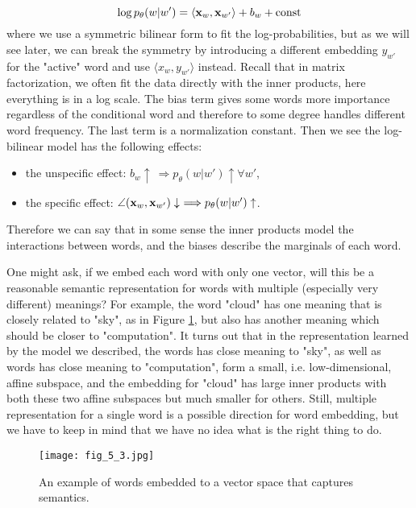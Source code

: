 \documentclass[../book-template.tex]{subfiles}
\begin{document}
\begin{equation}\label{eq_5_log_bi}
	\log p_{\theta}(w|w')=\langle {\bf x}_w,{\bf x}_{w'}\rangle + b_w + {\rm const}
\end{equation}
where we use a symmetric bilinear form to fit the log-probabilities, but as we will see later, we can break the symmetry by introducing a different embedding $y_{w'}$ for the "active" word and use $\langle x_w,y_{w'}\rangle$ instead. Recall that in matrix factorization, we often fit the data directly with the inner products, here everything is in a log scale. The bias term gives some words more importance regardless of the conditional word and therefore to some degree handles different word frequency. The last term is a normalization constant. Then we see the log-bilinear model has the following effects:
\begin{itemize}
	\item the unspecific effect: $b_w \uparrow\ \Longrightarrow p_{\theta}(w|w')\uparrow \forall w'$,
	\item the specific effect: $\angle({\bf x}_w,{\bf x}_{w'})\downarrow\ \Longrightarrow p_{\theta}(w|w')\uparrow$.
\end{itemize}
Therefore we can say that in some sense the inner products model the interactions between words, and the biases describe the marginals of each word.
\begin{remark}
	One might ask, if we embed each word with only one vector, will this be a reasonable semantic representation for words with multiple (especially very different) meanings? For example, the word "cloud" has one meaning that is closely related to "sky", as in Figure \ref{fig_5_3}, but also has another meaning which should be closer to "computation". It turns out that in the representation learned by the model we described, the words has close meaning to "sky", as well as words has close meaning to "computation", form a small, i.e. low-dimensional, affine subspace, and the embedding for "cloud" has large inner products with both these two affine subspaces but much smaller for others. Still, multiple representation for a single word is a possible direction for word embedding, but we have to keep in mind that we have no idea what is the right thing to do.
\end{remark}
\begin{figure}[t] 
	\centering 
	\texttt{[image: fig\_5\_3.jpg]} 
	\caption{An example of words embedded to a vector space that captures semantics.}\label{fig_5_3}
\end{figure}
\end{document}
